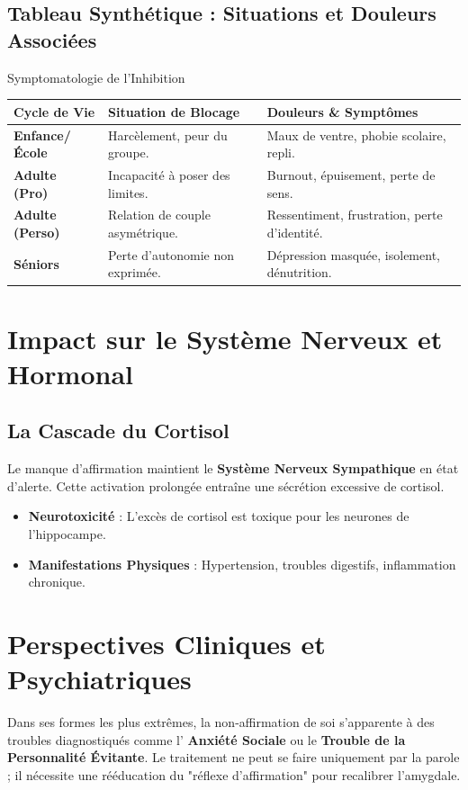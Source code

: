 \documentclass[11.5pt,a4paper]{article}
\begin{document}
\subsection{Tableau Synthétique : Situations et Douleurs Associées}

\begin{TableauSynthese}{Symptomatologie de l'Inhibition}
\begin{tabularx}{\textwidth}{|l|X|X|}
\hline
\textbf{Cycle de Vie} & \textbf{Situation de Blocage} & \textbf{Douleurs \& Symptômes} \\
\hline
\textbf{Enfance/École} & Harcèlement, peur du groupe. & Maux de ventre, phobie scolaire, repli. \\
\hline
\textbf{Adulte (Pro)} & Incapacité à poser des limites. & Burnout, épuisement, perte de sens. \\
\hline
\textbf{Adulte (Perso)} & Relation de couple asymétrique. & Ressentiment, frustration, perte d'identité. \\
\hline
\textbf{Séniors} & Perte d'autonomie non exprimée. & Dépression masquée, isolement, dénutrition. \\
\hline
\end{tabularx}
\end{TableauSynthese}

\section{Impact sur le Système Nerveux et Hormonal}

\subsection{La Cascade du Cortisol}
Le manque d'affirmation maintient le \textbf{Système Nerveux Sympathique} en état d'alerte. Cette activation prolongée entraîne une sécrétion excessive de cortisol. 
\begin{itemize}
    \item \textbf{Neurotoxicité} : L'excès de cortisol est toxique pour les neurones de l'hippocampe.
    \item \textbf{Manifestations Physiques} : Hypertension, troubles digestifs, inflammation chronique.
\end{itemize}

\section{Perspectives Cliniques et Psychiatriques}
Dans ses formes les plus extrêmes, la non-affirmation de soi s'apparente à des troubles diagnostiqués comme l' \textbf{Anxiété Sociale} ou le \textbf{Trouble de la Personnalité Évitante}. Le traitement ne peut se faire uniquement par la parole ; il nécessite une rééducation du "réflexe d'affirmation" pour recalibrer l'amygdale.
\end{document}
